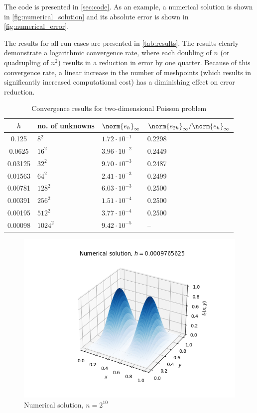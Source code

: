 \documentclass{template}
\begin{document}
The code is presented in \autoref{sec:code}. As an example, a numerical solution is shown in \autoref{fig:numerical_solution} and its absolute error is shown in \autoref{fig:numerical_error}.

The results for all run cases are presented in \autoref{tab:results}. The results clearly demonstrate a logarithmic convergence rate, where each doubling of $n$ (or quadrupling of $n^2$) results in a reduction in error by one quarter. Because of this convergence rate, a linear increase in the number of meshpoints (which results in significantly increased computational cost) has a diminishing effect on error reduction.


\begin{table}
    \centering
    \caption{Convergence results for two-dimensional Poisson problem}
    \label{tab:results}
    \begin{tabular}{c||l|l|l}
        $h$ & no. of unknowns & $\norm{e_h}_\infty$ & $\norm{e_{2h}}_\infty/\norm{e_h}_\infty$\\
        \hline
        0.125 & $8^2$     & $ 1.72\cdot 10^{-1}$  & 0.2298\\
        0.0625 & $16^2$   & $ 3.96\cdot 10^{-2}$  & 0.2449\\
        0.03125 & $32^2$  & $ 9.70\cdot 10^{-3}$  & 0.2487\\
        0.01563 & $64^2$  & $ 2.41\cdot 10^{-3}$  & 0.2499\\
        0.00781 & $128^2$ & $ 6.03\cdot 10^{-3}$  & 0.2500\\
        0.00391 & $256^2$ & $ 1.51\cdot 10^{-4}$  & 0.2500\\
        0.00195 & $512^2$ & $ 3.77\cdot 10^{-4}$  & 0.2500\\
        0.00098& $1024^2$ & $ 9.42\cdot 10^{-5}$  & --
    \end{tabular}
\end{table}

\begin{figure}[h]
    \centering
    \includegraphics[width=0.65\linewidth]{num_soln.png}
    \caption{Numerical solution, $n=2^{10}$}
    \label{fig:numerical_solution}
\end{figure}
\end{document}
